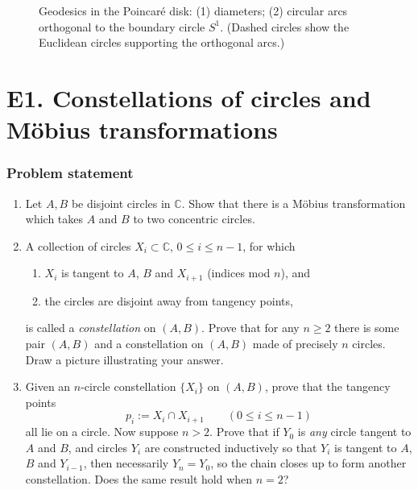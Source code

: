 \documentclass[12pt,a4paper]{article}
\newcommand{\C}{\mathbb{C}}
\theoremstyle{plain}
\theoremstyle{definition}      %
\begin{document}
\begin{figure}[ht]
		\caption{Geodesics in the Poincar\'e disk: (1) diameters; (2) circular arcs orthogonal to the boundary circle $S^1$. (Dashed circles show the Euclidean circles supporting the orthogonal arcs.)}
	\end{figure}
	
	\clearpage
	
\section*{E1. Constellations of circles and M\"obius transformations}

\subsubsection*{Problem statement}
\begin{enumerate}
	\item Let $A,B$ be disjoint circles in $\C$. Show that there is a M\"obius transformation which takes $A$ and $B$ to two concentric circles.
	\item A collection of circles $X_i\subset \C$, $0\le i\le n-1$, for which
	\begin{enumerate}
		\item $X_i$ is tangent to $A$, $B$ and $X_{i+1}$ (indices mod $n$), and
		\item the circles are disjoint away from tangency points,
	\end{enumerate}
	is called a \emph{constellation} on $(A,B)$.
	Prove that for any $n\ge 2$ there is some pair $(A,B)$ and a constellation on $(A,B)$ made of precisely $n$ circles.
	Draw a picture illustrating your answer.
	\item Given an $n$-circle constellation $\{X_i\}$ on $(A,B)$, prove that the tangency points
	\[
	p_i:=X_i\cap X_{i+1}\qquad (0\le i\le n-1)
	\]
	all lie on a circle. Now suppose $n>2$. Prove that if $Y_0$ is \emph{any} circle tangent to $A$ and $B$, and circles
	$Y_i$ are constructed inductively so that $Y_i$ is tangent to $A$, $B$ and $Y_{i-1}$, then necessarily $Y_n=Y_0$,
	so the chain closes up to form another constellation. Does the same result hold when $n=2$?
\end{enumerate}
\end{document}
